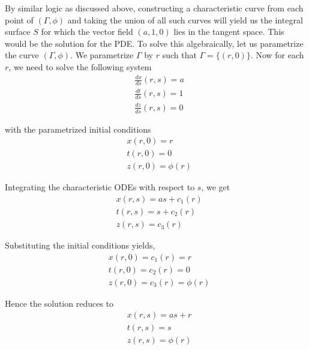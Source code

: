 \documentclass[11pt, a4paper]{report}
\begin{document}
By similar logic as discussed above, constructing a characteristic curve from each point of $(\Gamma, \phi)$ and taking
the union of all such curves will yield us the integral surface $S$ for which the vector field $(a, 1, 0)$ lies in the
tangent space. This would be the solution for the PDE. 
To solve this algebraically, let us parametrize the curve $(\Gamma, \phi)$. We parametrize $\Gamma$ by $r$ such that $
\Gamma = \{(r, 0)\}$. Now for each $r$, we need to solve the following system
\begin{equation*}
    \begin{aligned}
        & \frac {dx}{ds}(r, s) = a\\
        & \frac {dt}{ds}(r, s) = 1\\
        & \frac {dz}{ds}(r, s) = 0
    \end{aligned}
\end{equation*}

with the parametrized initial conditions
\begin{equation*}
    \begin{aligned}
        & x(r,0) = r\\[-0.5em]
        & t(r, 0) = 0\\[-0.5em]
        & z(r, 0) = \phi(r)
    \end{aligned}
\end{equation*}

Integrating the characteristic ODEs with respect to $s$, we get
\begin{equation*}
    \begin{aligned}
        & x(r,s) = as + c_1(r)\\[-0.5em]
        & t(r, s) = s + c_2(r)\\[-0.5em]
        & z(r, s) = c_3(r)
    \end{aligned}
\end{equation*}

Substituting the initial conditions yields,
\begin{equation*}
    \begin{aligned}
        & x(r,0) = c_1(r) = r\\[-0.5em]
        & t(r, 0) = c_2(r) = 0\\[-0.5em]
        & z(r, 0) = c_3(r) = \phi(r)
    \end{aligned}
\end{equation*}

Hence the solution reduces to
\begin{equation*}
    \begin{aligned}
        & x(r,s) = as + r\\[-0.5em]
        & t(r, s) = s\\[-0.5em]
        & z(r, s) = \phi(r)
    \end{aligned}
\end{equation*}
\end{document}
